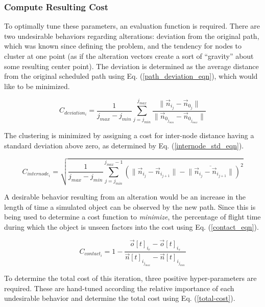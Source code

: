 \documentclass[conf]{new-aiaa}
\begin{document}
\subsubsection{Compute Resulting Cost}
To optimally tune these parameters, an evaluation function is required. There are two undesirable behaviors regarding alterations: deviation from the original path, which was known since defining the problem, and the tendency for nodes to cluster at one point (as if the alteration vectors create a sort of ``gravity'' about some resulting center point). The deviation is determined as the average distance from the original scheduled path using Eq. (\ref{path_deviation_eqn}), which would like to be minimized. 

\begin{equation}
\label{path_deviation_eqn}
C_{deviation_i} = \frac{1}{j_{max} - j_{min}}\sum\limits_{j=j_{min}}^{j_{max}}\frac{\|\vec{n}_{i_j} - \vec{n}_{0_j}\|}{\|\vec{n}_{0_{j_{min}}} - \vec{n}_{0_{j_{max}}}\|}
\end{equation}

The clustering is minimized by assigning a cost for inter-node distance having a standard deviation above zero, as determined by Eq. (\ref{internode_std_eqn}).

\begin{equation}
\label{internode_std_eqn}
C_{internode_i} = \sqrt{\frac{1}{j_{max} - j_{min}}\sum\limits_{j=j_{min}}^{j_{max} - 1}\left(\|\vec{n}_{i_j} - \vec{n}_{i_{j + 1}}\| - \overline{\|\vec{n}_{i_j} - \vec{n}_{i_{j + 1}}\|}\right)^2}
\end{equation}

A desirable behavior resulting from an alteration would be an increase in the length of time a simulated object can be observed by the new path. Since this is being used to determine a cost function to \emph{minimize}, the percentage of flight time during which the object is unseen factors into the cost using Eq. (\ref{contact_eqn}).

\begin{equation}
\label{contact_eqn}
C_{contact_i} = 1 - \frac{\vec{o}[t]_{i_{e}} - \vec{o}[t]_{i_{s}}}{\vec{n}[t]_{i_{j_{max}}} - \vec{n}[t]_{i_{j_{min}}}}
\end{equation}

To determine the total cost of this iteration, three positive hyper-parameters are required. These are hand-tuned according the relative importance of each undesirable behavior and determine the total cost using Eq. (\ref{total-cost}).
\end{document}
